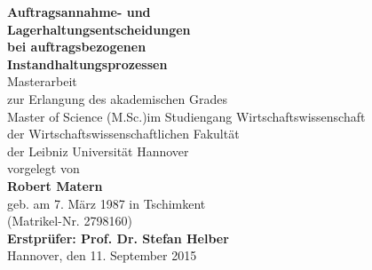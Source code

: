 \documentclass[a4paper,12pt,normalheadings,footexclude,headinclude,liststotoc,nochapterprefix,onecolumn,oneside,parskip,pointlessnumbers]{scrreprt}
\begin{document}
\newpage\thispagestyle{empty}\null\newpage
{}  %

\begin{titlepage}
\begin{sffamily}
\begin{center}
  {\Huge{\bf Auftragsannahme- und}}\\[0.5cm]
    {\Huge{\bf Lagerhaltungsentscheidungen}}\\[0.5cm]
  {\Huge{\bf bei auftragsbezogenen}} \\[0.5cm]
    {\Huge{\bf Instandhaltungsprozessen}} \\[3cm]
  {\huge Masterarbeit} \\[1cm]
  {\Large zur Erlangung des akademischen Grades \\
  \glqq Master of Science (M.Sc.)\grqq\;im Studiengang Wirtschaftswissenschaft} \\[8mm]
  {\Large der Wirtschaftswissenschaftlichen Fakult\"{a}t \\
  der Leibniz Universit\"{a}t Hannover} \\[2cm]
  {\Large vorgelegt von} \\[8mm]
  {\Large\bf Robert Matern} \\[5mm]
  {\Large geb. am 7. März 1987 in Tschimkent } \\[2mm]
  {\Large (Matrikel-Nr. 2798160)} \\[2cm]
  {\Large\bf Erstpr\"{u}fer: Prof. Dr. Stefan Helber} \\[6mm]
  {\Large Hannover, den 11. September 2015}
  \end{center}
  \end{sffamily}
\end{titlepage}
\newpage


\tableofcontents

\end{document}
